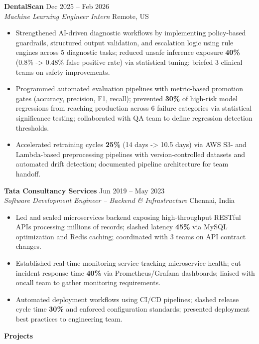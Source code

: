 \documentclass[10pt, letterpaper]{article}
\newcommand{\mysection}[1]{%
  \vspace{10pt}%
  {\noindent\large\bfseries #1}%
  \vspace{4pt}{\hrule}%
  \vspace{6pt}%
}
\newcommand{\resumeItem}[1]{\item\small{#1}}
\begin{document}
\noindent\textbf{DentalScan} \hfill Dec 2025 -- Feb 2026 \\
\textit{Machine Learning Engineer Intern} \hfill Remote, US
\begin{itemize}
  \resumeItem{Strengthened AI-driven diagnostic workflows by implementing policy-based guardrails, structured output validation, and escalation logic using rule engines across 5 diagnostic tasks; reduced unsafe inference exposure \textbf{40\%} (0.8\% -> 0.48\% false positive rate) via statistical tuning; briefed 3 clinical teams on safety improvements.}
  \resumeItem{Programmed automated evaluation pipelines with metric-based promotion gates (accuracy, precision, F1, recall); prevented \textbf{30\%} of high-risk model regressions from reaching production across 6 failure categories via statistical significance testing; collaborated with QA team to define regression detection thresholds.}
  \resumeItem{Accelerated retraining cycles \textbf{25\%} (14 days -> 10.5 days) via AWS S3- and Lambda-based preprocessing pipelines with version-controlled datasets and automated drift detection; documented pipeline architecture for team handoff.}
\end{itemize}

\noindent\textbf{Tata Consultancy Services} \hfill Jun 2019 -- May 2023 \\
\textit{Software Development Engineer -- Backend \& Infrastructure} \hfill Chennai, India
\begin{itemize}
  \resumeItem{Led and scaled microservices backend exposing high-throughput RESTful APIs processing millions of records; slashed latency \textbf{45\%} via MySQL optimization and Redis caching; coordinated with 3 teams on API contract changes.}
  \resumeItem{Established real-time monitoring service tracking microservice health; cut incident response time \textbf{40\%} via Prometheus/Grafana dashboards; liaised with oncall team to gather monitoring requirements.}
  \resumeItem{Automated deployment workflows using CI/CD pipelines; slashed release cycle time \textbf{30\%} and enforced configuration standards; presented deployment best practices to engineering team.}
\end{itemize}

\vspace{-3mm}
\mysection{Projects}
\end{document}
